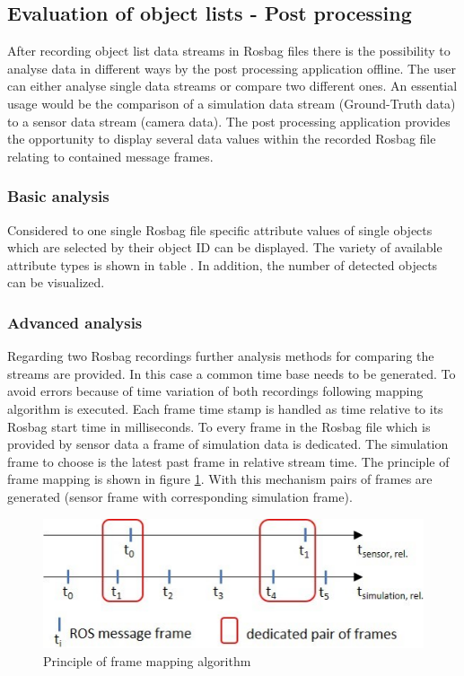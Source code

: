 \subsection{Evaluation of object lists - Post processing}

After recording object list data streams in Rosbag files there is the possibility to analyse data in different ways by the post processing application offline. The user can either analyse single data streams or compare two different ones. An essential usage would be the comparison of a simulation data stream (Ground-Truth data) to a sensor data stream (camera data). The post processing application provides the opportunity to display several data values within the recorded Rosbag file relating to contained message frames.

\subsubsection{Basic analysis}

Considered to one single Rosbag file specific attribute values of single objects which are selected by their object ID can be displayed. The variety of available attribute types is shown in table 
. In addition, the number of detected objects can be visualized. 

\subsubsection{Advanced analysis}

Regarding two Rosbag recordings further analysis methods for comparing the streams are provided. In this case a common time base needs to be generated. To avoid errors because of time variation of both recordings following mapping algorithm is executed. Each frame time stamp is handled as time relative to its Rosbag start time in milliseconds. To every frame in the Rosbag file which is provided by sensor data a frame of simulation data is dedicated. The simulation frame to choose is the latest past frame in relative stream time. The principle of frame mapping is shown in figure \ref{fig:frame_mapping}. With this mechanism pairs of frames are generated (sensor frame with corresponding simulation frame).

\begin{figure}[thpb]
	\centering
	\includegraphics[width=\linewidth]{images/frame_mapping.pdf}
	\caption{Principle of frame mapping algorithm}
	\label{fig:frame_mapping}
\end{figure}

